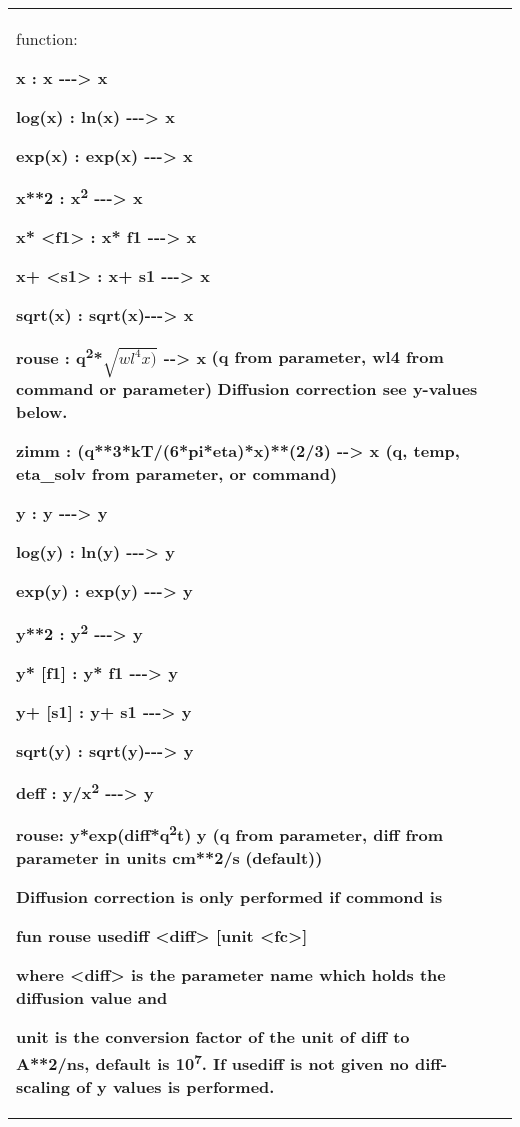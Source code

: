 \documentclass[]{article}
\begin{document}
\begin{longtable}[]{@{}ll@{}}
\begin{minipage}[t]{0.47\columnwidth}
function:

\textbf{x : x -\/-\/-\textgreater{} x }

\textbf{log(x) : ln(x) -\/-\/-\textgreater{} x }

\textbf{exp(x) : exp(x) -\/-\/-\textgreater{} x }

\textbf{x**2 : x\textsuperscript{2} -\/-\/-\textgreater{} x }

\textbf{x* \textless{}f1\textgreater{} : x* f1 -\/-\/-\textgreater{} x }

\textbf{x+ \textless{}s1\textgreater{} : x+ s1 -\/-\/-\textgreater{} x }

\textbf{sqrt(x) : sqrt(x)-\/-\/-\textgreater{} x }

\textbf{rouse : q\textsuperscript{2}*$\sqrt{wl^4 x)}$ -\/-\textgreater{} x}
\textbf{(q from parameter, wl4 from command or parameter)}
\textbf{Diffusion correction see y-values below.}

\textbf{zimm : (q**3*kT/(6*pi*eta)*x)**(2/3) -\/-\textgreater{} x (q,
temp, eta\_solv from parameter, or command)}

\textbf{y : y -\/-\/-\textgreater{} y }

\textbf{log(y) : ln(y) -\/-\/-\textgreater{} y }

\textbf{exp(y) : exp(y) -\/-\/-\textgreater{} y }

\textbf{y**2 : y\textsuperscript{2} -\/-\/-\textgreater{} y }

\textbf{y* {[}f1{]} : y* f1 -\/-\/-\textgreater{} y }

\textbf{y+ {[}s1{]} : y+ s1 -\/-\/-\textgreater{} y }

\textbf{sqrt(y) : sqrt(y)-\/-\/-\textgreater{} y }

\textbf{deff : y/x\textsuperscript{2} -\/-\/-\textgreater{} y}

\textbf{rouse: y*exp(diff*q\textsuperscript{2}t)} \textbf{y (q from
parameter, diff from parameter in units cm**2/s} \textbf{(default))}

\textbf{Diffusion correction is only performed if commond is}

\textbf{fun rouse usediff \textless{}diff\textgreater{} {[}unit
\textless{}fc\textgreater{}{]}}

\textbf{where \textless{}diff\textgreater{} is the parameter name which
holds the diffusion value and}

\textbf{unit is the conversion factor of the unit of diff to A**2/ns,
default is 10\textsuperscript{7}. If usediff is not given no
diff-scaling of y values is performed.}


\end{minipage}
\end{longtable}
\end{document}

